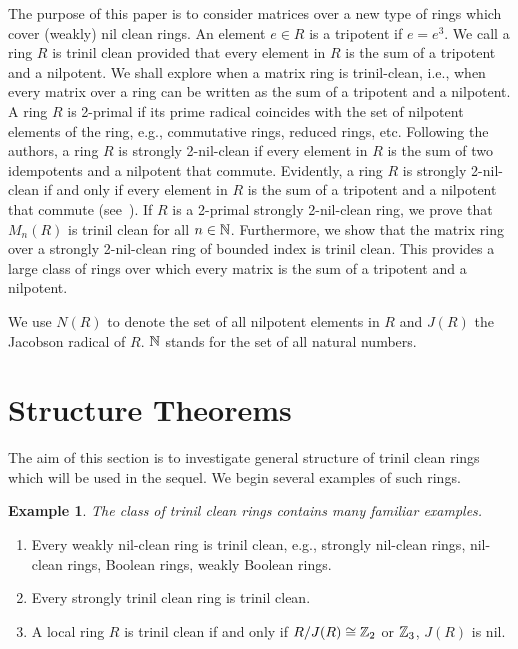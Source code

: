 \documentclass[12pt, reqno]{amsart}
\newtheorem{exam}[thm]{Example}
\numberwithin{equation}{section}
\begin{document}
The purpose of this paper is to consider matrices over a new type of rings which cover (weakly) nil clean rings. An element $e\in R$ is a tripotent if $e=e^3$. We call a ring $R$ is trinil clean provided that every element in $R$ is the sum of a tripotent and a nilpotent. We shall explore when a matrix ring is trinil-clean, i.e., when every matrix over a ring can be written as the sum of a tripotent and a nilpotent. A ring $R$ is 2-primal if its prime radical coincides with the set of nilpotent elements of the ring, e.g., commutative rings, reduced rings, etc.
Following the authors, a ring $R$ is strongly 2-nil-clean if every element in $R$ is the sum of two idempotents and a nilpotent that commute. Evidently, a ring $R$ is strongly 2-nil-clean if and only if every element in $R$ is the sum of a tripotent and a nilpotent that commute (see~\cite[Theorem 2.8]{CS}). If $R$ is a 2-primal strongly 2-nil-clean ring, we prove that $M_n(R)$ is trinil clean for all $n\in {\Bbb N}$.
Furthermore, we show that the matrix ring over a strongly 2-nil-clean ring of bounded index is trinil clean. This provides a large class of rings over which
every matrix is the sum of a tripotent and a nilpotent.

We use $N(R)$ to denote the set of all nilpotent elements in $R$ and $J(R)$ the Jacobson radical of $R$.
${\Bbb N}$ stands for the set of all natural numbers.

\section{Structure Theorems}

\vskip4mm The aim of this section is to investigate general structure of trinil clean rings which will be used in the sequel.
We begin several examples of such rings.

\begin{exam} The class of trinil clean rings contains many familiar examples.\end{exam}
\begin{enumerate}
\item [(1)] Every weakly nil-clean ring is trinil clean, e.g., strongly nil-clean rings, nil-clean rings, Boolean rings, weakly Boolean rings.
\item [(2)] Every strongly trinil clean ring is trinil clean.
\item [(3)] A local ring $R$ is trinil clean if and only if $R/J(R)\cong {\Bbb Z}_2$ or ${\Bbb Z}_3$, $J(R)$ is nil.
\end{enumerate}
\vspace{-.5mm}
\end{document}
